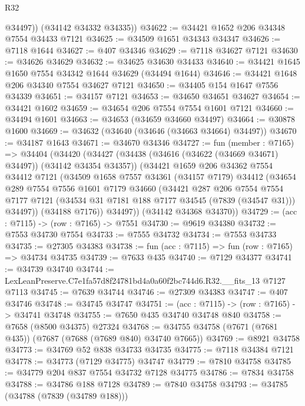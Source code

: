 \begin{lexlean}{R32}
\begin{coremodule}
          @34497))
      (@34142 @34332 @34335))
@34622 := @34421 @1652 @206 @34348 @7554 @34433 @7121
@34625 := @34509 @1651 @34343 @34347
@34626 := @7118 @1644
@34627 := @407 @34346
@34629 := @7118 @34627 @7121
@34630 := @34626 @34629
@34632 := @34625 @34630 @34433
@34640 := @34421 @1645 @1650 @7554 @34342 @1644 @34629 (@34494 @1644)
@34646 := @34421 @1648 @206 @34340 @7554 @34627 @7121
@34650 := @34405 @154 @1647 @7556 @34339
@34651 := @34157 @7121
@34653 := @34650 @34651 @34627
@34654 := @34421 @1602
@34659 := @34654 @206 @7554 @7554 @1601 @7121
@34660 := @34494 @1601
@34663 := @34653 (@34659 @34660 @34497)
@34664 := @30878 @1600
@34669 := @34632 (@34640 (@34646 (@34663 @34664) @34497))
@34670 := @34187 @1643
@34671 := @34670 @34346
@34727 := fun (member : @7165) =>
  @34404
    (@34420
      (@34427
        (@34438 (@34616 (@34622 (@34669 @34671) @34497)) (@34142 @34354 @34357))
        (@34421
          @1659
          @206
          @34362
          @7554
          @34412
          @7121
          (@34509
            @1658
            @7557
            @34361
            (@34157 @7179)
            @34412
            (@34654
              @289
              @7554
              @7556
              @1601
              @7179
              @34660
              (@34421
                @287
                @206
                @7554
                @7554
                @7177
                @7121
                (@34534 @31 @7181 @188 @7177 @34545 (@7839 (@34547 @31)))
                @34497))
            (@34188 @7176))
          @34497))
      (@34142 @34368 @34370))
@34729 := (acc : @7115) -> (row : @7165) -> @7551
@34730 := @9619 @34380
@34732 := @7553 @34730 @7554
@34733 := @7555 @34732
@34734 := @7553 @34733
@34735 := @27305 @34383
@34738 := fun (acc : @7115) => fun (row : @7165) => @34734 @34735
@34739 := @7633 @435
@34740 := @7129 @34377
@34741 := @34739 @34740
@34744 := LexLeanPreserve.C7e1fa57d8f24781bd4a0a60f2bc744d6.R32.__fits_13 @7127 @7113
@34745 := @7639 @34744
@34746 := @27309 @34383
@34747 := @407 @34746
@34748 := @34745 @34747
@34751 := (acc : @7115) -> (row : @7165) -> @34741 @34748
@34755 := @7650 @435 @34740 @34748 @840
@34758 := @7658 (@8500 @34375) @27324
@34768 := @34755 @34758 (@7671 (@7681 @435)) (@7687 (@7688 (@7689 @840) @34740 @7665))
@34769 := @8921 @34758
@34773 := @34769 @52 @838 @34733 @34735
@34775 := @7118 @34384 @7121
@34778 := @34773 (@7129 @34775) @34747
@34779 := @7810 @34758
@34785 := @34779 @204 @837 @7554 @34732 @7128 @34775
@34786 := @7834 @34758
@34788 := @34786 @188 @7128
@34789 := @7840 @34758
@34793 := @34785 (@34788 (@7839 (@34789 @188)))

\end{coremodule}
\end{lexlean}
